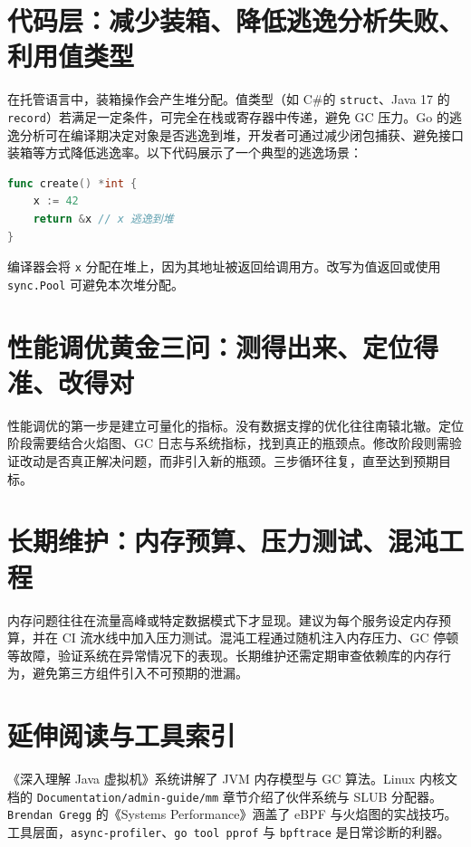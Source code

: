 \chapter{代码层：减少装箱、降低逃逸分析失败、利用值类型}
在托管语言中，装箱操作会产生堆分配。值类型（如 C\#{}的 \texttt{struct}、Java 17 的 \texttt{record}）若满足一定条件，可完全在栈或寄存器中传递，避免 GC 压力。Go 的逃逸分析可在编译期决定对象是否逃逸到堆，开发者可通过减少闭包捕获、避免接口装箱等方式降低逃逸率。以下代码展示了一个典型的逃逸场景：\par
\begin{lstlisting}[language=go]
func create() *int {
    x := 42
    return &x // x 逃逸到堆
}
\end{lstlisting}
编译器会将 \texttt{x} 分配在堆上，因为其地址被返回给调用方。改写为值返回或使用 \texttt{sync.Pool} 可避免本次堆分配。\par
\chapter{性能调优黄金三问：测得出来、定位得准、改得对}
性能调优的第一步是建立可量化的指标。没有数据支撑的优化往往南辕北辙。定位阶段需要结合火焰图、GC 日志与系统指标，找到真正的瓶颈点。修改阶段则需验证改动是否真正解决问题，而非引入新的瓶颈。三步循环往复，直至达到预期目标。\par
\chapter{长期维护：内存预算、压力测试、混沌工程}
内存问题往往在流量高峰或特定数据模式下才显现。建议为每个服务设定内存预算，并在 CI 流水线中加入压力测试。混沌工程通过随机注入内存压力、GC 停顿等故障，验证系统在异常情况下的表现。长期维护还需定期审查依赖库的内存行为，避免第三方组件引入不可预期的泄漏。\par
\chapter{延伸阅读与工具索引}
《深入理解 Java 虚拟机》系统讲解了 JVM 内存模型与 GC 算法。Linux 内核文档的 \texttt{Documentation/admin-guide/mm} 章节介绍了伙伴系统与 SLUB 分配器。\texttt{ Brendan Gregg} 的《Systems Performance》涵盖了 eBPF 与火焰图的实战技巧。工具层面，\texttt{async-profiler}、\texttt{go tool pprof} 与 \texttt{bpftrace} 是日常诊断的利器。\par
